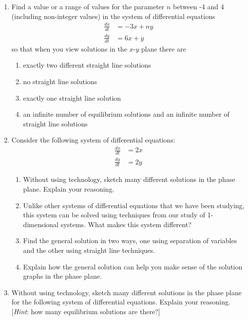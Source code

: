 \begin{enumerate}[resume]
\begin{enumerate}
\clearpage

\item	Find a value or a range of values for the parameter $n$ between -4 and 4 (including non-integer values) in the system of differential equations \label{12HWproblem5}
\begin{align*}
\frac{dx}{dt}&= -3x+ny\\ \frac{dy}{dt}&= 6x+y
\end{align*}  
so that when you view solutions in the $x$-$y$ plane there are
\begin{enumerate}
\item exactly two different straight line solutions \label{12HWproblem5parta}
\item	no straight line solutions \label{12HWproblem5partb}
\item	exactly one straight line solution \label{12HWproblem5partc}
\item	an infinite number of equilibrium solutions and an infinite number of straight line solutions \label{12HWproblem5partd}
\end{enumerate}

\item	Consider the following system of differential equations: \label{12HWproblem6}
\begin{align*}
\frac{dx}{dt}&= 2x \\ \frac{dy}{dt}&= 2y
\end{align*}  
\begin{enumerate}
\item Without using technology, sketch many different solutions in the phase plane. Explain your reasoning.  \label{12HWproblem6parta}
\item	Unlike other systems of differential equations that we have been studying, this system can be solved using techniques from our study of 1-dimensional systems.  What makes this system different?  \label{12HWproblem6partb}
\item	Find the general solution in two ways, one using separation of variables and the other using straight line techniques. \label{12HWproblem6partc}
\item	Explain how the general solution can help you make sense of the solution graphs in the phase plane.  \label{12HWproblem6partd}
\end{enumerate}

\item Without using technology, sketch many different solutions in the phase plane for the following system of differential equations. Explain your reasoning. [\textit{Hint}: how many equilibrium solutions are there?] \label{12HWproblem7}


\end{enumerate}
\end{enumerate}
